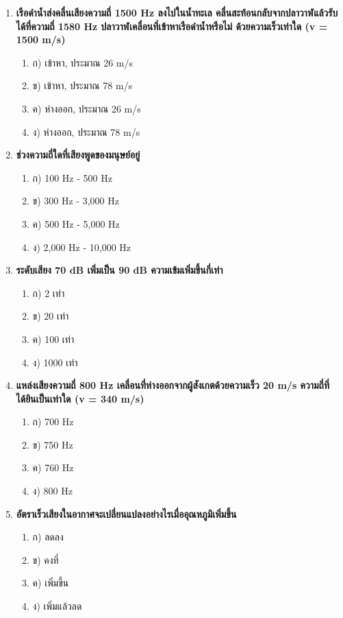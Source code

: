 \documentclass[12pt]{article}
\begin{document}
\begin{enumerate}
\begin{enumerate}
\item ง) 10 dB
\end{enumerate}
\item \textbf{เรือดำน้ำส่งคลื่นเสียงความถี่ 1500 Hz ลงไปในน้ำทะเล คลื่นสะท้อนกลับจากปลาวาฬแล้วรับได้ที่ความถี่ 1580 Hz ปลาวาฬเคลื่อนที่เข้าหาเรือดำน้ำหรือไม่ ด้วยความเร็วเท่าใด (v = 1500 m/s)}
\begin{enumerate}
\item ก) เข้าหา, ประมาณ 26 m/s
\item ข) เข้าหา, ประมาณ 78 m/s
\item ค) ห่างออก, ประมาณ 26 m/s
\item ง) ห่างออก, ประมาณ 78 m/s
\end{enumerate}
\item \textbf{ช่วงความถี่ใดที่เสียงพูดของมนุษย์อยู่}
\begin{enumerate}
\item ก) 100 Hz - 500 Hz
\item ข) 300 Hz - 3,000 Hz
\item ค) 500 Hz - 5,000 Hz
\item ง) 2,000 Hz - 10,000 Hz
\end{enumerate}
\item \textbf{ระดับเสียง 70 dB เพิ่มเป็น 90 dB ความเข้มเพิ่มขึ้นกี่เท่า}
\begin{enumerate}
\item ก) 2 เท่า
\item ข) 20 เท่า
\item ค) 100 เท่า
\item ง) 1000 เท่า
\end{enumerate}
\item \textbf{แหล่งเสียงความถี่ 800 Hz เคลื่อนที่ห่างออกจากผู้สังเกตด้วยความเร็ว 20 m/s ความถี่ที่ได้ยินเป็นเท่าใด (v = 340 m/s)}
\begin{enumerate}
\item ก) 700 Hz
\item ข) 750 Hz
\item ค) 760 Hz
\item ง) 800 Hz
\end{enumerate}
\item \textbf{อัตราเร็วเสียงในอากาศจะเปลี่ยนแปลงอย่างไรเมื่ออุณหภูมิเพิ่มขึ้น}
\begin{enumerate}
\item ก) ลดลง
\item ข) คงที่
\item ค) เพิ่มขึ้น
\item ง) เพิ่มแล้วลด
\end{enumerate}

\end{enumerate}
\end{document}
